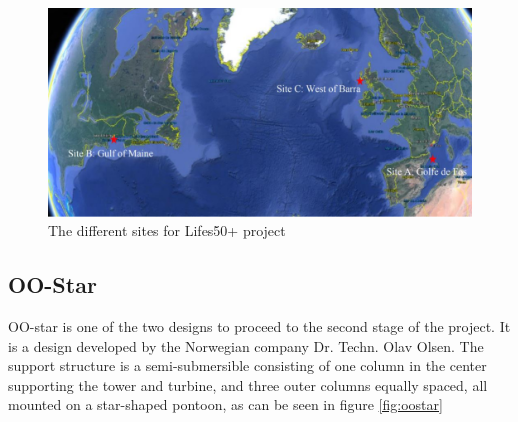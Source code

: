 \begin{figure}[H]
\centering
\includegraphics[scale=0.6]{figures/sites}
\caption[$\; \:$Sites for Lifes50+ project]{The different sites for Lifes50+ project \cite{Lifes50+D1.6} }
 \label{fig:sites}
\end{figure}

\subsection{OO-Star}
OO-star is one of the two designs to proceed to the second stage of the project. It is a design developed by the Norwegian company Dr. Techn. Olav Olsen.\newline
\newline
The support structure is a semi-submersible consisting of one column in the center supporting the tower and turbine, and three outer columns equally spaced, all mounted on a star-shaped pontoon, as can be seen in figure \ref{fig:oostar}

